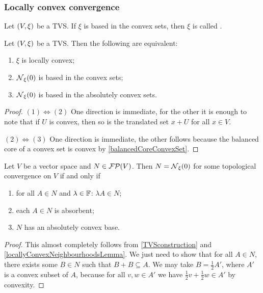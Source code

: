 \subsubsection{Locally convex convergence}
\begin{definition}
Let $\left( V,\xi \right)$ be a TVS. If $\xi$ is based in the convex sets, then $\xi$ is called .
\end{definition}
\begin{lemma} \label{locallyConvexNeighbourhoodsLemma}
Let $\left( V,\xi \right)$ be a TVS. Then the following are equivalent:
\begin{enumerate}
\item $\xi$ is locally convex;
\item $\operatorname{\mathcal{N}}_\xi(0)$ is based in the convex sets;
\item $\operatorname{\mathcal{N}}_\xi(0)$ is based in the absolutely convex sets.
\end{enumerate}
\end{lemma}
\begin{proof}
$(1) \Leftrightarrow (2)$ One direction is immediate, for the other it is enough to note that if $U$ is convex, then so is the translated set $x+U$ for all $x\in V$.

$(2) \Leftrightarrow (3)$ One direction is immediate, the other follows because the balanced core of a convex set is convex by \ref{balancedCoreConvexSet}.
\end{proof}

\begin{proposition}
Let $V$ be a vector space and $N\in\operatorname{\mathcal{FP}}(V)$. Then $N = \operatorname{\mathcal{N}}_\xi(0)$ for some topological convergence on $V$ \textup{if and only if}
\begin{enumerate}
\item for all $A\in N$ and $\lambda\in \mathbb{F}$: $\lambda A\in N$;
\item each $A \in N$ is absorbent;
\item $N$ has an absolutely convex base.
\end{enumerate}
\end{proposition}
\begin{proof}
This almost completely follows from \ref{TVSconstruction} and \ref{locallyConvexNeighbourhoodsLemma}. We just need to show that for all $A\in N$, there exists some $B\in N$ such that $B+B\subseteq A$. We may take $B = \frac{1}{2}A'$, where $A'$ is a convex subset of $A$, because for all $v,w\in A'$ we have $\frac{1}{2}v + \frac{1}{2}w \in A'$ by convexity.
\end{proof}

